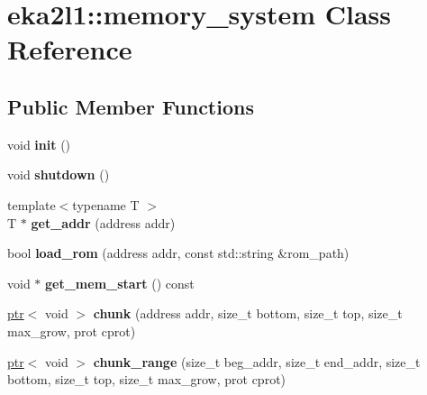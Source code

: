 \hypertarget{classeka2l1_1_1memory__system}{}\section{eka2l1\+:\+:memory\+\_\+system Class Reference}
\label{classeka2l1_1_1memory__system}
\subsection*{Public Member Functions}
\begin{DoxyCompactItemize}
\item 
\mbox{\label{classeka2l1_1_1memory__system_a960fd7767db6ba7dc0cdeb8bf9c1f7b1}} 
void {\bfseries init} ()
\item 
\mbox{\label{classeka2l1_1_1memory__system_a98b843641ab4d9167f3fff95e34de715}} 
void {\bfseries shutdown} ()
\item 
\mbox{\label{classeka2l1_1_1memory__system_ac59cc9b87c63cc6e187642b19d4af22d}} 
{\footnotesize template$<$typename T $>$ }\\T $\ast$ {\bfseries get\+\_\+addr} (address addr)
\item 
\mbox{\label{classeka2l1_1_1memory__system_a3eb9703184a1b34c4f2005a6f12649a3}} 
bool {\bfseries load\+\_\+rom} (address addr, const std\+::string \&rom\+\_\+path)
\item 
\mbox{\label{classeka2l1_1_1memory__system_a757af7c3c8882ce654e962de582ad5ca}} 
void $\ast$ {\bfseries get\+\_\+mem\+\_\+start} () const
\item 
\mbox{\label{classeka2l1_1_1memory__system_a63b4fba37b310170985e0ffc11b6e2fb}} 
\mbox{\hyperlink{classeka2l1_1_1ptr}{ptr}}$<$ void $>$ {\bfseries chunk} (address addr, size\+\_\+t bottom, size\+\_\+t top, size\+\_\+t max\+\_\+grow, prot cprot)
\item 
\mbox{\label{classeka2l1_1_1memory__system_a1a6eaa999e09654c27a808d2a669a4f2}} 
\mbox{\hyperlink{classeka2l1_1_1ptr}{ptr}}$<$ void $>$ {\bfseries chunk\+\_\+range} (size\+\_\+t beg\+\_\+addr, size\+\_\+t end\+\_\+addr, size\+\_\+t bottom, size\+\_\+t top, size\+\_\+t max\+\_\+grow, prot cprot)

\end{DoxyCompactItemize}
